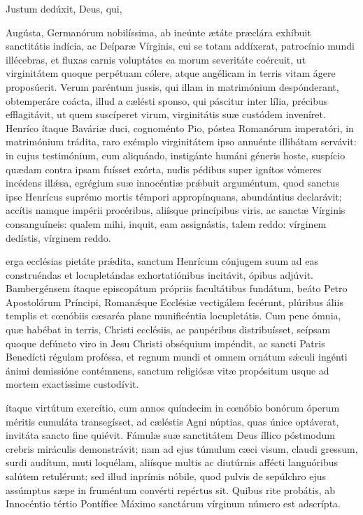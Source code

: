 \documentclass[fontsize=9pt,paper=A6,twoside,BCOR=1mm,DIV=22,headinclude]{scrarticle}
\begin{document}
\begin{multicols}{2}
{

\MiiC 

\V Justum dedúxit,  Deus, qui, 



 Augústa, Germanórum nobilíssima, ab ineúnte ætáte præclára exhíbuit sanctitátis indícia, ac Deíparæ Vírginis, cui se totam addíxerat, patrocínio mundi illécebras, et fluxas carnis voluptátes ea morum severitáte coércuit, ut virginitátem quoque perpétuam cólere, atque angélicam in terris vitam ágere proposúerit. Verum paréntum jussis, qui illam in matrimónium despónderant, obtemperáre coácta, illud a cælésti sponso, qui páscitur inter lília, précibus efflagitávit, ut quem suscíperet virum, virginitátis suæ custódem inveníret. Henríco ítaque Baváriæ duci, cognoménto Pio, póstea Romanórum imperatóri, in matrimónium trádita, raro exémplo virginitátem ipso annuénte illibátam servávit: in cujus testimónium, cum aliquándo, instigánte humáni géneris hoste, suspício quædam contra ipsam fuísset exórta, nudis pédibus super ignítos vómeres incédens ill\'æsa, egrégium suæ innocéntiæ pr\'æbuit arguméntum, quod sanctus ipse Henrícus suprémo mortis témpori appropínquans, abundántius declarávit; accítis namque impérii procéribus, aliísque princípibus viris, ac sanctæ Vírginis consanguíneis: qualem mihi, inquit, eam assignástis, talem reddo: vírginem dedístis, vírginem reddo.

\RVViv

 erga ecclésias pietáte pr\'ædita, sanctum Henrícum cónjugem suum ad eas construéndas et locupletándas exhortatiónibus incitávit, ópibus adjúvit. Bambergénsem ítaque episcopátum própriis facultátibus fundátum, beáto Petro Apostolórum Príncipi, Roman\'æque Ecclésiæ vectigálem fecérunt, plúribus áliis templis et cœnóbiis cæsaréa plane munificéntia locupletátis. Cum pene ómnia, quæ habébat in terris, Christi ecclésiis, ac paupéribus distribuísset, seípsam quoque defúncto viro in Jesu Christi obséquium impéndit, ac sancti Patris Benedícti régulam proféssa, et regnum mundi et omnem ornátum s\'æculi ingénti ánimi demissióne contémnens, sanctum religiósæ vitæ propósitum usque ad mortem exactíssime custodívit.

\RVVv 

 ítaque virtútum exercítio, cum annos quíndecim in cœnóbio bonórum óperum méritis cumuláta transegísset, ad cæléstis Agni núptias, quas únice optáverat, invitáta sancto fine quiévit. Fámulæ suæ sanctitátem Deus íllico póstmodum crebris miráculis demonstrávit; nam ad ejus túmulum cæci visum, claudi gressum, surdi audítum, muti loquélam, aliísque multis ac diutúrnis affécti languóribus salútem retulérunt; sed illud inprímis nóbile, quod pulvis de sepúlchro ejus assúmptus sæpe in fruméntum convérti repértus sit. Quibus rite probátis, ab Innocéntio tértio Pontífice Máximo sanctárum vírginum número est adscrípta.

}
\end{multicols}
\end{document}
